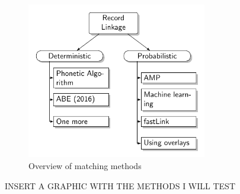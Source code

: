 \documentclass[12pt]{article}
\begin{document}
\begin{figure}[h!]
\centering
\caption{Overview of matching methods}
\includegraphics[width=0.7\textwidth]{./RecordLinkageGraphics.pdf}
\end{figure}

INSERT A GRAPHIC WITH THE METHODS I WILL TEST
\end{document}
